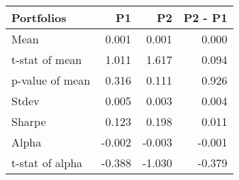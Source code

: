 \begin{tabular}{lrrr}
\toprule
Portfolios & P1 & P2 & P2 - P1 \\
\midrule
Mean & 0.001 & 0.001 & 0.000 \\
t-stat of mean & 1.011 & 1.617 & 0.094 \\
p-value of mean & 0.316 & 0.111 & 0.926 \\
Stdev & 0.005 & 0.003 & 0.004 \\
Sharpe & 0.123 & 0.198 & 0.011 \\
Alpha & -0.002 & -0.003 & -0.001 \\
t-stat of alpha & -0.388 & -1.030 & -0.379 \\
\bottomrule
\end{tabular}
